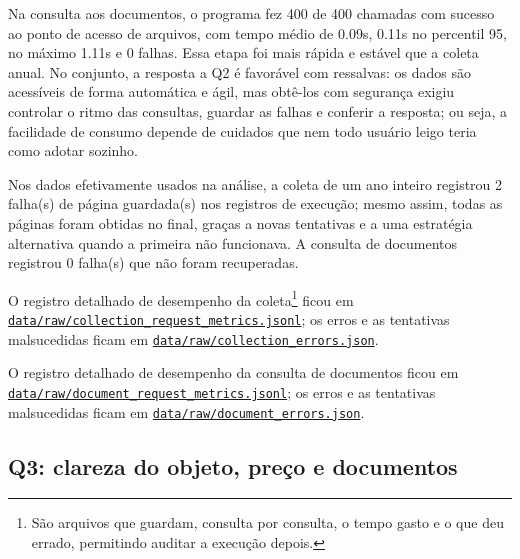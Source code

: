 \documentclass[12pt]{article}
\begin{document}
Na consulta aos documentos, o programa fez 400 de 400 chamadas com
sucesso ao ponto de acesso de arquivos, com tempo médio de 0.09s, 0.11s
no percentil 95, no máximo 1.11s e 0 falhas. Essa etapa foi mais rápida
e estável que a coleta anual. No conjunto, a resposta a Q2 é favorável
com ressalvas: os dados são acessíveis de forma automática e ágil, mas
obtê-los com segurança exigiu controlar o ritmo das consultas, guardar
as falhas e conferir a resposta; ou seja, a facilidade de consumo
depende de cuidados que nem todo usuário leigo teria como adotar
sozinho.

Nos dados efetivamente usados na análise, a coleta de um ano inteiro
registrou 2 falha(s) de página guardada(s) nos registros de execução;
mesmo assim, todas as páginas foram obtidas no final, graças a novas
tentativas e a uma estratégia alternativa quando a primeira não
funcionava. A consulta de documentos registrou 0 falha(s) que não foram
recuperadas.

O registro detalhado de desempenho da coleta\footnote{São arquivos que
  guardam, consulta por consulta, o tempo gasto e o que deu errado,
  permitindo auditar a execução depois.} ficou em
\href{https://github.com/Amorim33/analise-pncp/blob/main/data/raw/collection_request_metrics.jsonl}{\texttt{data/raw/collection\_request\_metrics.jsonl}};
os erros e as tentativas malsucedidas ficam em
\href{https://github.com/Amorim33/analise-pncp/blob/main/data/raw/collection_errors.json}{\texttt{data/raw/collection\_errors.json}}.

O registro detalhado de desempenho da consulta de documentos ficou em
\href{https://github.com/Amorim33/analise-pncp/blob/main/data/raw/document_request_metrics.jsonl}{\texttt{data/raw/document\_request\_metrics.jsonl}};
os erros e as tentativas malsucedidas ficam em
\href{https://github.com/Amorim33/analise-pncp/blob/main/data/raw/document_errors.json}{\texttt{data/raw/document\_errors.json}}.

\subsection{Q3: clareza do objeto, preço e
documentos}\label{q3-clareza-do-objeto-preuxe7o-e-documentos}
\end{document}
